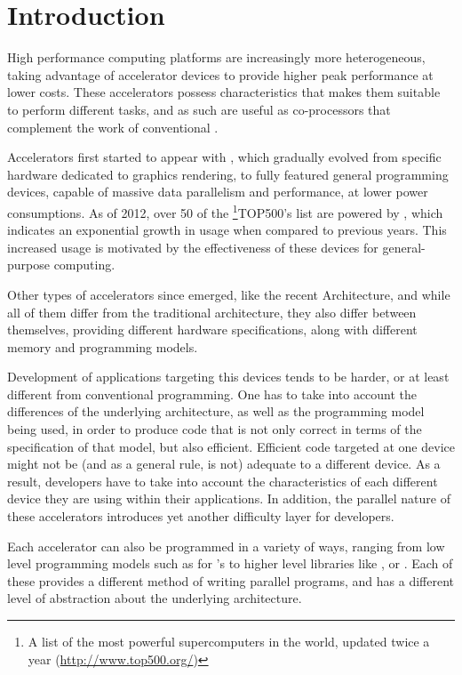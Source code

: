 \documentclass[main.tex]{subfiles}
\begin{document}
\chapter{Introduction}

High performance computing platforms are increasingly more heterogeneous, taking advantage of accelerator devices to provide higher peak performance at lower costs. These accelerators possess characteristics that makes them suitable to perform different tasks, and as such are useful as co-processors that complement the work of conventional \cpus.

Accelerators first started to appear with \gpus, which gradually evolved from specific hardware dedicated to graphics rendering, to fully featured general programming devices, capable of massive data parallelism and performance, at lower power consumptions. As of 2012, over 50 of the \footnote{A list of the most powerful supercomputers in the world, updated twice a year (\url{http://www.top500.org/})}{TOP500's} list are powered by \gpus, which indicates an exponential growth in usage when compared to previous years. This increased usage is motivated by the effectiveness of these devices for general-purpose computing. 

Other types of accelerators since emerged, like the recent \intel \mic Architecture, and while all of them differ from the traditional \cpu architecture, they also differ between themselves, providing different hardware specifications, along with different memory and programming models. 

Development of applications targeting this devices tends to be harder, or at least different from conventional programming. One has to take into account the differences of the underlying architecture, as well as the programming model being used, in order to produce code that is not only correct in terms of the specification of that model, but also efficient. Efficient code targeted at one device might not be (and as a general rule, is not) adequate to a different device. As a result, developers have to take into account the characteristics of each different device they are using within their applications. In addition, the parallel nature of these accelerators introduces yet another difficulty layer for developers.

Each accelerator can also be programmed in a variety of ways, ranging from low level programming models such as \cuda for \nvidia's \gpus to higher level libraries like \openmp, or \openacc. Each of these provides a different method of writing parallel programs, and has a different level of abstraction about the underlying architecture. 
\end{document}

